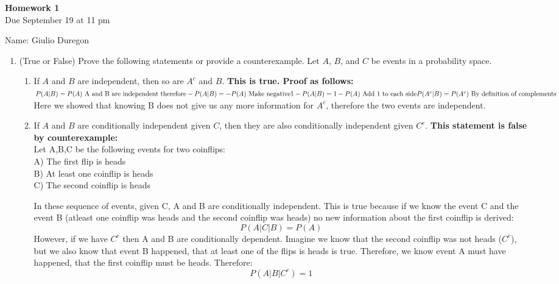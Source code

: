 \documentclass[12pt,twoside]{article}
\begin{document}
\begin{center}
{\large{\textbf{Homework 1}} } \vspace{0.2cm}\\
Due September 19 at 11 pm
\\
\end{center}
Name: Giulio Duregon

\break

\begin{enumerate}

\item (True or False)
Prove the following statements or provide a counterexample. Let $A$, $B$, and $C$ be events in a probability space.

\begin{enumerate}
\item If $A$ and $B$ are independent, then so are $A^c$ and $B$.
\subitem
\textbf{This is true. Proof as follows:}\\
$
    P(A|B) = P(A) \text{ A and B are independent therefore} \\
    -P(A|B) = -P(A) \text{ Make negative}\\
    1-P(A|B) = 1-P(A) \text{ Add 1 to each side} \\
    P(A^c|B) = P(A^c) \text{ By definition of complements}
$ \\
Here we showed that knowing B does not give us any more information for $A^c$, therefore the two events are independent. 

\item If $A$ and $B$ are conditionally independent given $C$, then they are also conditionally independent given $C^c$.
\subitem
\textbf{This statement is false by counterexample:}\\
Let A,B,C be the following events for two coinflips:\\
A) The first flip is heads \\
B) At least one coinflip is heads \\
C) The second coinflip is heads \\
\par
In these sequence of events, given C, A and B are conditionally independent. This is true because if we know the event C and the event B (atleast one coinflip was heads and the second coinflip was heads) no new information about the first coinflip is derived:
$$P(A|C|B) = P(A) $$
However, if we have $C^c$ then A and B are conditionally dependent. Imagine we know that the second coinflip was not heads ($C^c$), but we also know that event B happened, that at least one of the flips is heads is true. Therefore, we know event A must have happened, that the first coinflip must be heads. Therefore: 
$$P(A|B|C^c) = 1 $$



\end{enumerate}
\end{enumerate}
\end{document}

